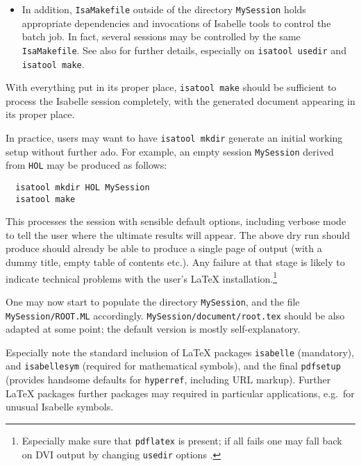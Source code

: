 \begin{isabellebody}
\begin{isamarkuptext}
\begin{itemize}
  \item In addition, \texttt{IsaMakefile} outside of the directory
  \texttt{MySession} holds appropriate dependencies and invocations of
  Isabelle tools to control the batch job.  In fact, several sessions
  may be controlled by the same \texttt{IsaMakefile}.  See also
  \cite{isabelle-sys} for further details, especially on
  \texttt{isatool usedir} and \texttt{isatool make}.

  \end{itemize}

  With everything put in its proper place, \texttt{isatool make}
  should be sufficient to process the Isabelle session completely,
  with the generated document appearing in its proper place.

  \medskip In practice, users may want to have \texttt{isatool mkdir}
  generate an initial working setup without further ado.  For example,
  an empty session \texttt{MySession} derived from \texttt{HOL} may be
  produced as follows:

\begin{verbatim}
  isatool mkdir HOL MySession
  isatool make
\end{verbatim}

  This processes the session with sensible default options, including
  verbose mode to tell the user where the ultimate results will
  appear.  The above dry run should produce should already be able to
  produce a single page of output (with a dummy title, empty table of
  contents etc.).  Any failure at that stage is likely to indicate
  technical problems with the user's {\LaTeX}
  installation.\footnote{Especially make sure that \texttt{pdflatex}
  is present; if all fails one may fall back on DVI output by changing
  \texttt{usedir} options \cite{isabelle-sys}.}

  \medskip One may now start to populate the directory
  \texttt{MySession}, and the file \texttt{MySession/ROOT.ML}
  accordingly.  \texttt{MySession/document/root.tex} should be also
  adapted at some point; the default version is mostly
  self-explanatory.

  Especially note the standard inclusion of {\LaTeX} packages
  \texttt{isabelle} (mandatory), and \texttt{isabellesym} (required
  for mathematical symbols), and the final \texttt{pdfsetup} (provides
  handsome defaults for \texttt{hyperref}, including URL markup).
  Further {\LaTeX} packages further packages may required in
  particular applications, e.g.\ for unusual Isabelle symbols.


\end{isamarkuptext}
\end{isabellebody}
